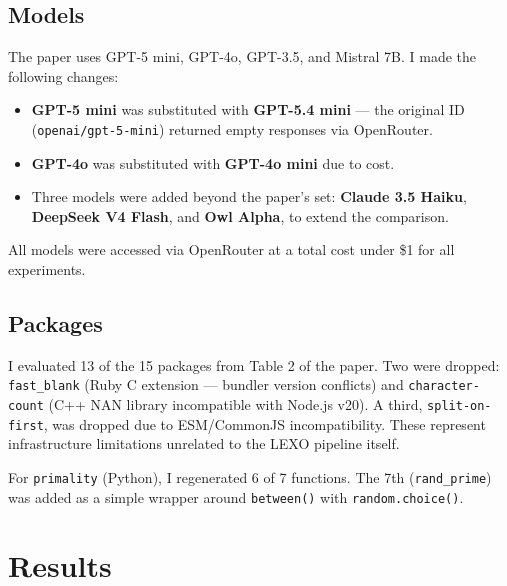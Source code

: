 \documentclass[11pt,a4paper]{article}
\begin{document}
\subsection{Models}

The paper uses GPT-5 mini, GPT-4o, GPT-3.5, and Mistral 7B. I made the
following changes:

\begin{itemize}[leftmargin=*]
  \item \textbf{GPT-5 mini} was substituted with \textbf{GPT-5.4 mini} —
  the original ID (\texttt{openai/gpt-5-mini}) returned empty responses via
  OpenRouter.
  \item \textbf{GPT-4o} was substituted with \textbf{GPT-4o mini} due to
  cost.
  \item Three models were added beyond the paper's set: \textbf{Claude 3.5
  Haiku}, \textbf{DeepSeek V4 Flash}, and \textbf{Owl Alpha}, to extend the
  comparison.
\end{itemize}

All models were accessed via OpenRouter at a total cost under \$1 for all
experiments.

\subsection{Packages}

I evaluated 13 of the 15 packages from Table 2 of the paper. Two were dropped:
\texttt{fast\_blank} (Ruby C extension — bundler version conflicts) and
\texttt{character-count} (C++ NAN library incompatible with Node.js v20).
A third, \texttt{split-on-first}, was dropped due to ESM/CommonJS
incompatibility. These represent infrastructure limitations unrelated to the
LEXO pipeline itself.

For \texttt{primality} (Python), I regenerated 6 of 7 functions. The 7th
(\texttt{rand\_prime}) was added as a simple wrapper around \texttt{between()}
with \texttt{random.choice()}.

\section{Results}
\end{document}
